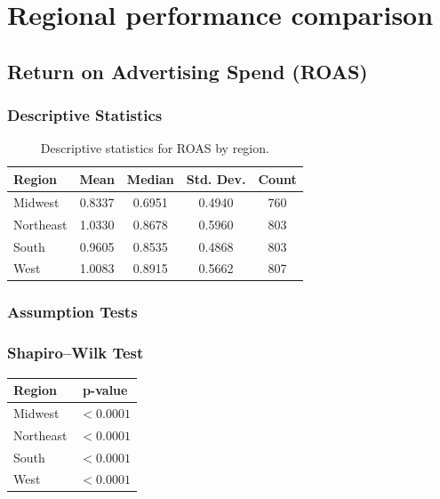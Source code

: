 

\section{Regional performance comparison }\label{appendix:regional_performance_analysis}

\subsection{Return on Advertising Spend (ROAS)} \label{appendix:regional_performance_analysis_ROAS}

\subsubsection{Descriptive Statistics}

\begin{table}[H]
	\centering
	\caption{Descriptive statistics for ROAS by region.}
	\begin{tabular}{lcccc}
		\toprule
		Region & Mean & Median & Std. Dev. & Count \\
		\midrule
		Midwest & 0.8337 & 0.6951 & 0.4940 & 760 \\
		Northeast & 1.0330 & 0.8678 & 0.5960 & 803 \\
		South & 0.9605 & 0.8535 & 0.4868 & 803 \\
		West & 1.0083 & 0.8915 & 0.5662 & 807 \\
		\bottomrule
	\end{tabular}
\end{table}

\subsubsection{Assumption Tests}

\subsubsection{Shapiro--Wilk Test}

\begin{table}[H]
	\centering
	\begin{tabular}{lc}
		\toprule
		Region & p-value \\
		\midrule
		Midwest & $<0.0001$ \\
		Northeast & $<0.0001$ \\
		South & $<0.0001$ \\
		West & $<0.0001$ \\
		\bottomrule
	\end{tabular}
\end{table}

